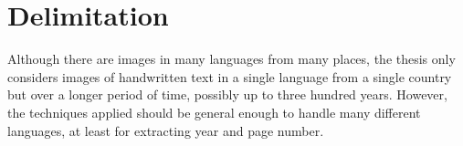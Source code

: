 \section{Delimitation}

Although there are images in many languages from many places, the thesis only considers images of handwritten text in a single language from a single country but over a longer period of time, possibly up to three hundred years.
However, the techniques applied should be general enough to handle many different languages, at least for extracting year and page number.

